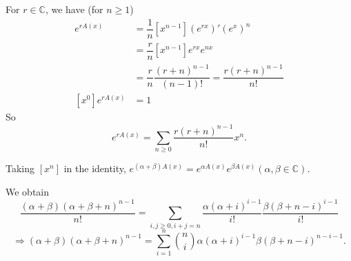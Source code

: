\begin{theorem}
For $r\in \mathbb{C}$, we have (for $n\geq 1$)
\begin{align*}
[x^n]e^{rA(x)} &= \dfrac{1}{n}[x^{n-1}](e^{rx})'(e^x)^n\\
&=\dfrac{r}{n}[x^{n-1}]e^{rx}e^{nx}\\
&=\dfrac{r}{n}\dfrac{(r+n)^{n-1}}{(n-1)!}=\dfrac{r(r+n)^{n-1}}{n!}\\
[x^0]e^{rA(x)}&=1
\end{align*}
So $$e^{rA(x)}=\sum_{n\geq 0}\dfrac{r(r+n)^{n-1}}{n!}x^n.$$

Taking $[x^n]$ in the identity,
$e^{(\alpha +\beta)A(x)}=e^{\alpha A(x)}e^{\beta A(x)}(\alpha , \beta \in \mathbb{C}).$

We obtain
$$\dfrac{(\alpha+\beta)(\alpha+\beta+n)^{n-1}}{n!}=\sum\limits_{i,j\geq 0, i+j=n} \dfrac{\alpha(\alpha+i)^{i-1}}{i!}\dfrac{\beta(\beta+n-i)^{i-1}}{i!}$$
$$\Rightarrow (\alpha+\beta)(\alpha+\beta+n)^{n-1}=\sum\limits_{i=1}^n{n \choose i} \alpha (\alpha+i)^{i-1} \beta (\beta+n-i)^{n-i-1}.$$

\end{theorem}

